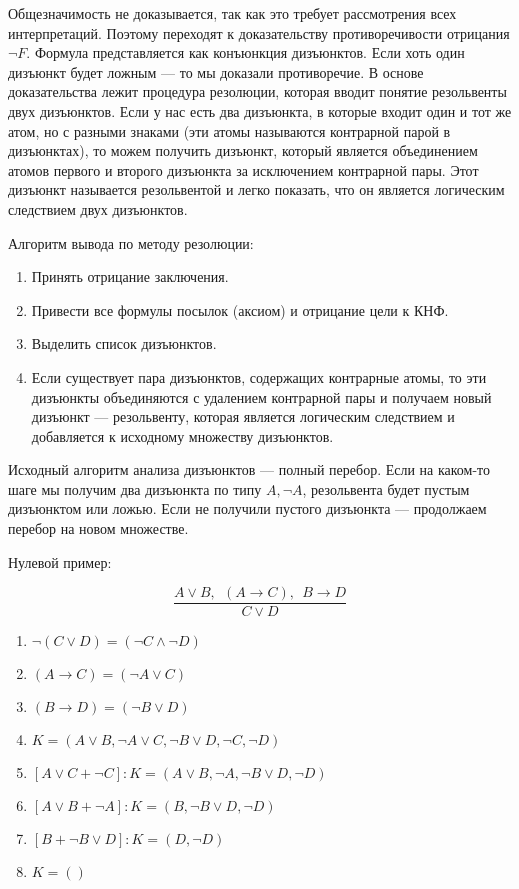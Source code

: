 Общезначимость не доказывается, так как это требует рассмотрения всех интерпретаций. Поэтому переходят к доказательству противоречивости отрицания $\neg F$. Формула представляется как конъюнкция дизъюнктов. Если хоть один дизъюнкт будет ложным --- то мы доказали противоречие. В основе доказательства лежит процедура резолюции, которая вводит понятие резольвенты двух дизъюнктов. Если у нас есть два дизъюнкта, в которые входит один и тот же атом, но с разными знаками (эти атомы называются контрарной парой в дизъюнктах), то можем получить дизъюнкт, который является объединением атомов первого и второго дизъюнкта за исключением контрарной пары. Этот дизъюнкт называется резольвентой и легко показать, что он является логическим следствием двух дизъюнктов.


Алгоритм вывода по методу резолюции:

\begin{enumerate}
    \item Принять отрицание заключения.
    \item Привести все формулы посылок (аксиом) и отрицание цели к КНФ.
    \item Выделить список дизъюнктов.
    \item Если существует пара дизъюнктов, содержащих контрарные атомы, то эти дизъюнкты объединяются с удалением контрарной пары и получаем новый дизъюнкт --- резольвенту, которая является логическим следствием и добавляется к исходному множеству дизъюнктов.
\end{enumerate}

Исходный алгоритм анализа дизъюнктов --- полный перебор. Если на каком-то шаге мы получим два дизъюнкта по типу $A, \neg A$, резольвента будет пустым дизъюнктом или ложью. Если не получили пустого дизъюнкта --- продолжаем перебор на новом множестве.

Нулевой пример:

$$\frac{A \vee B, ~~ (A \rightarrow C), ~~ B \rightarrow D}{C \vee D}$$

\begin{enumerate}
    \item $\neg (C \vee D) = (\neg C \wedge \neg D)$
    \item $(A \rightarrow C) = (\neg A \vee C)$
    \item $(B \rightarrow D) = (\neg B \vee D)$
    \item $K = (A \vee B, \neg A \vee C, \neg B \vee D, \neg C, \neg D)$
    \item $[A \vee C + \neg C]: K = (A \vee B, \neg A, \neg B \vee D, \neg D)$
    \item $[A \vee B + \neg A]: K = (B, \neg B \vee D, \neg D)$
    \item $[B + \neg B \vee D]: K = (D, \neg D)$
    \item $K = ()$
\end{enumerate}


